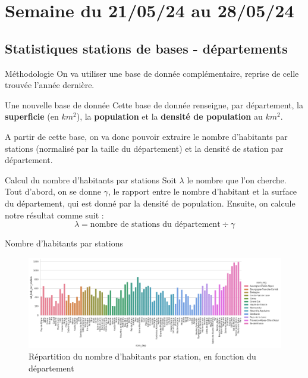 \smallframetitle

\section{Semaine du 21/05/24 au 28/05/24}
\insertsectionframe

\subsection{Statistiques stations de bases - départements}
\insertsubsectionframe

\begin{frame}{Méthodologie}
    On va utiliser une base de donnée complémentaire, reprise de celle trouvée l'année dernière.

    \begin{block}{Une nouvelle base de donnée\footnotemark}
        Cette base de donnée renseigne, par département, la \textbf{superficie} (en $\unit{km^2}$), la \textbf{population} et la \textbf{densité de population} au $\unit{km^2}$.
    \end{block}
    
    A partir de cette base, on va donc pouvoir extraire le nombre d'habitants par stations (normalisé par la taille du département) et la densité de station par département.

    \begin{block}{Calcul du nombre d'habitants par stations}
        Soit $\lambda$ le nombre que l'on cherche. Tout d'abord, on se donne $\gamma$, le rapport entre le nombre d'habitant et la surface du département, qui est donné par la densité de population.
        Ensuite, on calcule notre résultat comme suit :$$\lambda = \text{nombre de stations du département}\div\gamma$$
    \end{block}

\end{frame}

\begin{frame}{Nombre d'habitants par stations}
    \begin{figure}
        \includegraphics[width=0.9\paperwidth]{images/barplots/nb_hab_par_station_par_dep.png}
        \caption{\label{fig:nb_hap_par_stat_par_dep}Répartition du nombre d'habitants par station, en fonction du département}
    \end{figure}
\end{frame}

